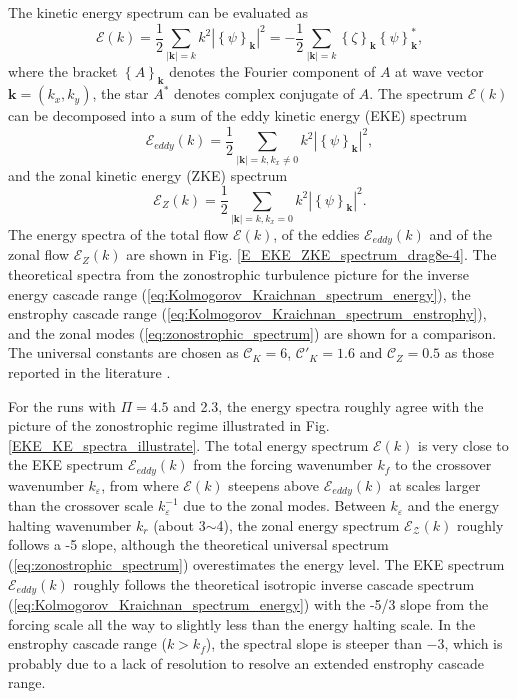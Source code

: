 \documentclass{ametsoc}
\begin{document}
The kinetic energy spectrum can be evaluated as
\begin{equation}
\mathcal{E}(k)=\frac{1}{2}\underset{|\mathbf{k}|=k}{\sum}k^{2}|\left\{ \psi\right\} _{\mathbf{k}}|^{2}=-\frac{1}{2}\underset{|\mathbf{k}|=k}{\sum}\left\{ \zeta\right\} _{\mathbf{k}}\left\{ \psi\right\} _{\mathbf{k}}^{*},\label{eq:energy_spectrum_psi_zeta}
\end{equation}
where the bracket $\left\{ A\right\} _{\mathbf{k}}$ denotes the Fourier
component of $A$ at wave vector $\mathbf{k}=(k_{x},k_{y})$, the
star $A^{*}$ denotes complex conjugate of $A$. The spectrum $\mathcal{E}(k)$
can be decomposed into a sum of the eddy kinetic energy (EKE) spectrum
\begin{equation}
\mathcal{E}_{eddy}(k)=\frac{1}{2}\underset{|\mathbf{k}|=k,k_{x}\neq0}{\sum}k^{2}|\left\{ \psi\right\} _{\mathbf{k}}|^{2},\label{eq:EKE_spec_psi}
\end{equation}
and the zonal kinetic energy (ZKE) spectrum
\begin{equation}
\mathcal{E}_{Z}(k)=\frac{1}{2}\underset{|\mathbf{k}|=k,k_{x}=0}{\sum}k^{2}|\left\{ \psi\right\} _{\mathbf{k}}|^{2}.\label{eq:ZKE_spec_psi}
\end{equation}
The energy spectra of the total flow $\mathcal{E}(k)$, of the eddies
$\mathcal{E}_{eddy}(k)$ and of the zonal flow $\mathcal{E}_{Z}(k)$
are shown in Fig. \ref{E_EKE_ZKE_spectrum_drag8e-4}. The theoretical
spectra from the zonostrophic turbulence picture for the inverse energy 
cascade range (\ref{eq:Kolmogorov_Kraichnan_spectrum_energy}),
the enstrophy cascade range (\ref{eq:Kolmogorov_Kraichnan_spectrum_enstrophy}),
and the zonal modes (\ref{eq:zonostrophic_spectrum}) 
are shown for a comparison. The universal constants are chosen as
$\mathcal{C}_{K}=6$, $\mathcal{C'}_{K}=1.6$ and $\mathcal{C}_{Z}=0.5$
as those reported in the literature \citep{Boffetta2012,Galperin2010}.

For the runs with $\Pi=4.5$ and 2.3, the energy spectra roughly agree
with the picture of the zonostrophic regime illustrated in Fig. \ref{EKE_KE_spectra_illustrate}.
The total energy spectrum $\mathcal{E}(k)$ is very close to the EKE
spectrum $\mathcal{E}_{eddy}(k)$ from the forcing wavenumber $k_{f}$
to the crossover wavenumber $k_{\varepsilon}$, from where $\mathcal{E}(k)$
steepens above $\mathcal{E}_{eddy}(k)$ at scales larger than the
crossover scale $k_{\varepsilon}^{-1}$ due to the zonal modes. Between
$k_{\varepsilon}$ and the energy halting wavenumber $k_{r}$ (about
3$\sim$4), the zonal energy spectrum $\mathcal{E}_{\mathcal{Z}}(k)$
roughly follows a -5 slope, although the theoretical universal spectrum
(\ref{eq:zonostrophic_spectrum}) overestimates the energy level.
The EKE spectrum $\mathcal{E}_{eddy}(k)$ roughly follows the theoretical
isotropic inverse cascade spectrum (\ref{eq:Kolmogorov_Kraichnan_spectrum_energy})
with the -5/3 slope from the forcing scale all the way to slightly
less than the energy halting scale. In the enstrophy cascade range
($k>k_{f}$), the spectral slope is steeper than $-3$, which is probably
due to a lack of resolution to resolve an extended enstrophy cascade
range.
\end{document}
